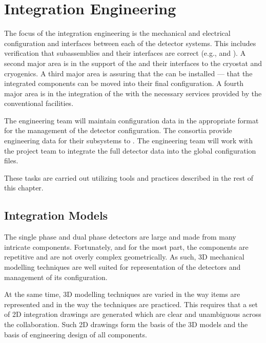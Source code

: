 \chapter{Integration Engineering}
\label{sec:fdsp-coord-integ-sysengr}


The focus of the integration engineering is the mechanical and
electrical configuration and interfaces between each of the detector
systems. This includes verification that subassemblies and their
interfaces are correct (e.g.,  and \single {}). A
second major area is in the support of the  and
their interfaces to the cryostat and cryogenics. A third major area is
assuring that the  can be installed --- that the
integrated components can be moved into their final configuration. A
fourth major area is in the integration of the  with
the necessary services provided by the conventional facilities.


The  engineering team will maintain configuration data in
the appropriate format for the management of the detector
configuration. The consortia provide engineering data for their
subsystems to . The  engineering team will work
with the  project team to integrate the full detector data
into the global  configuration files.

These tasks are carried out utilizing tools and practices
described in the rest of this chapter.

\section{Integration Models}
\label{sec:fdsp-coord-integ-models}
The single phase and dual phase detectors are large and made from many
intricate components. Fortunately, and for the most part, the
components are repetitive and are not overly complex geometrically. As
such, 3D mechanical modelling techniques are well suited for
representation of the detectors and management of its configuration.


At the same time, 3D modelling techniques are varied in the way items
are represented and in the way the techniques are practiced. This
requires that a set of 2D integration drawings are generated which are
clear and unambiguous across the collaboration. Such 2D drawings form
the basis of the 3D models and the basis of engineering design of all
components.

